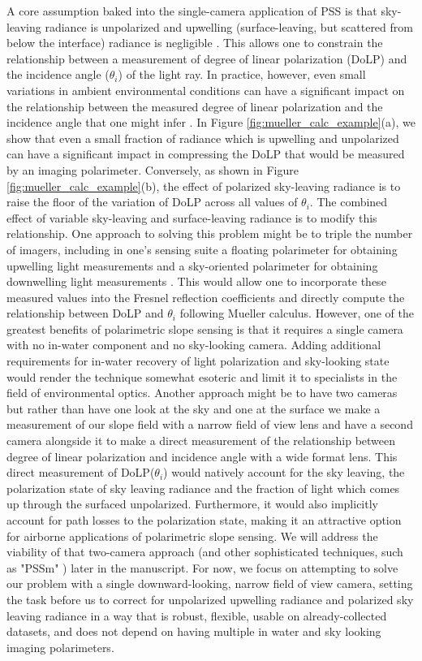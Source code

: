 \documentclass[letterpaper,journal]{IEEEtran}
\begin{document}
	A core assumption baked into the single-camera application of PSS is that sky-leaving radiance is unpolarized and upwelling (surface-leaving, but scattered from below the interface) radiance is negligible \cite{Zappa2008}. This allows one to constrain the relationship between a measurement of degree of linear polarization (DoLP) and the incidence angle ($\theta_i$) of the light ray. In practice, however, even small variations in ambient environmental conditions can have a significant impact on the relationship between the measured degree of linear polarization and the incidence angle that one might infer \cite{goldstein_polarized_2017,voss_polarized_1997}. In Figure \ref{fig:mueller_calc_example}(a), we show that even a small fraction of radiance which is upwelling and unpolarized can have a significant impact in compressing the DoLP that would be measured by an imaging polarimeter. Conversely, as shown in Figure \ref{fig:mueller_calc_example}(b), the effect of polarized sky-leaving radiance is to raise the floor of the variation of DoLP across all values of $\theta_i$. The combined effect of variable sky-leaving and surface-leaving radiance is to modify this relationship. One approach to solving this problem might be to triple the number of imagers, including in one's sensing suite a floating polarimeter for obtaining upwelling light measurements and a sky-oriented polarimeter for obtaining downwelling light measurements \cite{Barsic2012}. This would allow one to incorporate these measured values into the Fresnel reflection coefficients and directly compute the relationship between DoLP and $\theta_i$ following Mueller calculus. However, one of the greatest benefits of polarimetric slope sensing is that it requires a single camera with no in-water component and no sky-looking camera. Adding additional requirements for in-water recovery of light polarization and sky-looking state would render the technique somewhat esoteric and limit it to specialists in the field of environmental optics. Another approach might be to have two cameras but rather than have one look at the sky and one at the surface we make a measurement of our slope field with a narrow field of view lens and have a second camera alongside it to make a direct measurement of the relationship between degree of linear polarization and incidence angle with a wide format lens. This direct measurement of DoLP($\theta_i$) would natively account for the sky leaving, the polarization state of sky leaving radiance and the fraction of light which comes up through the surfaced unpolarized. Furthermore, it would also implicitly account for path losses to the polarization state, making it an attractive option for airborne applications of polarimetric slope sensing. We will address the viability of that two-camera approach (and other sophisticated techniques, such as "PSSm" \cite{malinowski_surface_2024}) later in the manuscript. For now, we focus on attempting to solve our problem with a single downward-looking, narrow field of view camera, setting the task before us to correct for unpolarized upwelling radiance and polarized sky leaving radiance in a way that is robust, flexible, usable on already-collected datasets, and does not depend on having multiple in water and sky looking imaging polarimeters.
	
\end{document}
